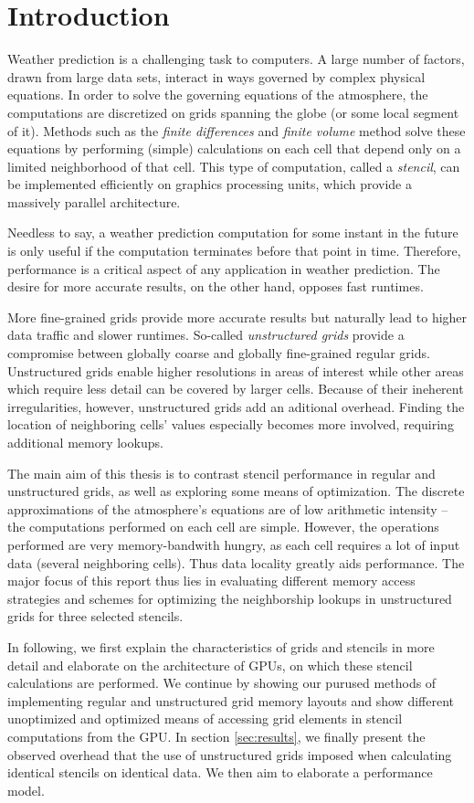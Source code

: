 \section{Introduction}

Weather prediction is a challenging task to computers. A large number of factors, drawn from large data sets, interact in ways governed by complex physical equations. In order to solve the governing equations of the atmosphere, the computations are discretized on grids spanning the globe (or some local segment of it). Methods such as the \emph{finite differences} and \emph{finite volume} method solve these equations by performing (simple) calculations on each cell that depend only on a limited neighborhood of that cell. This type of computation, called a \emph{stencil}, can be implemented efficiently on graphics processing units, which provide a massively parallel architecture. 

Needless to say, a weather prediction computation for some instant in the future is only useful if the computation terminates before that point in time. Therefore, performance is a critical aspect of any application in weather prediction. The desire for more accurate results, on the other hand, opposes fast runtimes.

More fine-grained grids provide more accurate results but naturally lead to higher data traffic and slower runtimes. So-called \emph{unstructured grids} provide a compromise between globally coarse and globally fine-grained regular grids. Unstructured grids enable higher resolutions in areas of interest while other areas which require less detail can be covered by larger cells. Because of their ineherent irregularities, however, unstructured grids add an aditional overhead. Finding the location of neighboring cells' values especially becomes more involved, requiring additional memory lookups.

The main aim of this thesis is to contrast stencil performance in regular and unstructured grids, as well as exploring some means of optimization. The discrete approximations of the atmosphere's equations are of low arithmetic intensity -- the computations performed on each cell are simple. However, the operations performed are very memory-bandwith hungry, as each cell requires a lot of input data (several neighboring cells). Thus data locality greatly aids performance. The major focus of this report thus lies in evaluating different memory access strategies and schemes for optimizing the neighborship lookups in unstructured grids for three selected stencils.

In following, we first explain the characteristics of grids and stencils in more detail and elaborate on the architecture of GPUs, on which these stencil calculations are performed. We continue by showing our purused methods of implementing regular and unstructured grid memory layouts and show different unoptimized and optimized means of accessing grid elements in stencil computations from the GPU. In section \ref{sec:results}, we finally present the observed overhead that the use of unstructured grids imposed when calculating identical stencils on identical data. We then aim to elaborate a performance model.